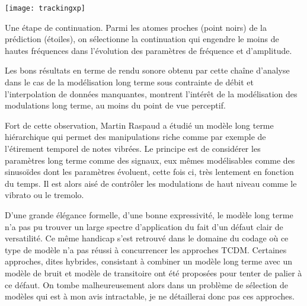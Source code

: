 \begin{marginfigure}
  \texttt{[image: trackingxp]}
  \caption{Une étape de continuation. Parmi les atomes proches (point noirs) de la prédiction (étoiles), on sélectionne la continuation qui engendre le moins de hautes fréquences dans l'évolution des paramètres de fréquence et d'amplitude.}
  \label{fig:tracking}
\end{marginfigure}

Les bons résultats en terme de rendu sonore obtenu par cette chaîne d'analyse dans le cas  de la modélisation long terme sous contrainte de débit\cite{lagrangeTaslp06} et l'interpolation de données manquantes\cite{lagrangeJaes05}, montrent l'intérêt de la modélisation des modulations long terme, au moins du point de vue perceptif.

Fort de cette observation, Martin Raspaud a étudié un modèle long terme hiérarchique qui permet des manipulations riche comme par exemple de l'étirement temporel de notes vibrées\cite{raspaud2007modeles}. Le principe est de considérer les paramètres long terme comme des signaux, eux mêmes modélisables comme des sinusoïdes dont les paramètres évoluent, cette fois ci, très lentement en fonction du temps. Il est alors aisé de contrôler les modulations de haut niveau comme le vibrato ou le tremolo.

D'une grande élégance formelle, d'une bonne expressivité, le modèle long terme n'a pas pu trouver un large spectre d'application du fait d'un défaut clair de versatilité. Ce même handicap s'est retrouvé dans le domaine du codage où ce type de modèle\cite{den2002parametric} n'a pas réussi à concurrencer les approches TCDM. Certaines approches, dites hybrides, consistant à combiner un modèle long terme avec un modèle de bruit et modèle de transitoire ont été proposées pour tenter de palier à ce défaut. On tombe malheureusement alors dans un problème de sélection de modèles qui est à mon avis intractable, je ne détaillerai donc pas ces approches.


